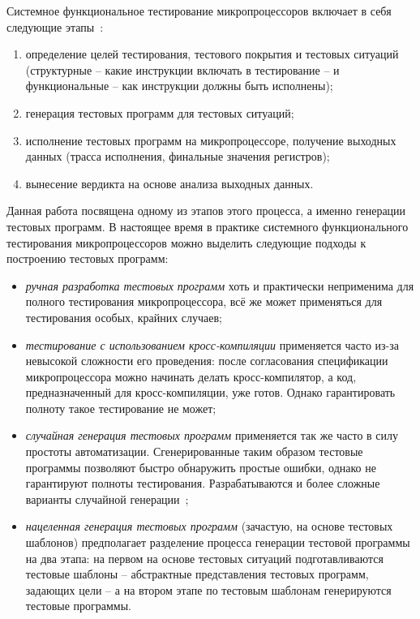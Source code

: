 Системное функциональное тестирование микропроцессоров включает в
себя следующие этапы~\cite{kamkin}:
\begin{enumerate}
\item определение целей тестирования, тестового покрытия и тестовых
ситуаций (структурные -- какие инструкции включать в тестирование --
и функциональные -- как инструкции должны быть исполнены);
\item генерация тестовых программ для тестовых ситуаций;
\item исполнение тестовых программ на микропроцессоре, получение
выходных данных (трасса исполнения, финальные значения регистров);
\item вынесение вердикта на основе анализа выходных данных.
\end{enumerate}

Данная работа посвящена одному из этапов этого процесса, а именно
генерации тестовых программ. В настоящее время в практике системного
функционального тестирования микропроцессоров можно выделить
следующие подходы к построению тестовых программ:
\begin{itemize}
\item \emph{ручная разработка тестовых программ} хоть и практически неприменима
для полного тестирования микропроцессора, всё же может применяться
для тестирования особых, крайних случаев;
\item \emph{тестирование с использованием кросс-компиляции} применяется часто
из-за невысокой сложности его проведения: после согласования
спецификации микропроцессора можно начинать делать кросс-компилятор,
а код, предназначенный для кросс-компиляции, уже готов. Однако
гарантировать полноту такое тестирование не может;
\item \emph{случайная генерация тестовых программ} применяется так же часто в
силу простоты автоматизации. Сгенерированные таким образом тестовые
программы позволяют быстро обнаружить простые ошибки, однако не
гарантируют полноты тестирования. Разрабатываются и более сложные
варианты случайной генерации~\cite{muGP};
\item \emph{нацеленная генерация тестовых программ} (зачастую, на основе тестовых
шаблонов) предполагает разделение процесса генерации тестовой
программы на два этапа: на первом на основе тестовых ситуаций
подготавливаются тестовые шаблоны -- абстрактные представления
тестовых программ, задающих цели -- а на втором этапе по тестовым
шаблонам генерируются тестовые программы.
\end{itemize}

